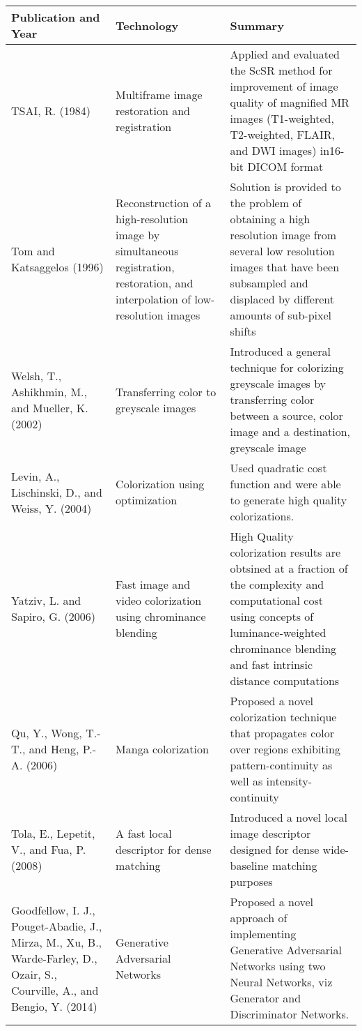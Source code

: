 \documentclass[12pt]{article}
\begin{document}
  \begin{tabularx}{\textwidth}{| X | X | X | } \hline
\textbf{Publication and Year} &	 \textbf{Technology} & \textbf{Summary} \\ \hline


TSAI, R. (1984) & Multiframe image restoration and registration & Applied and evaluated the ScSR method for improvement of image quality of magnified MR images (T1-weighted, T2-weighted, FLAIR, and DWI images) in16-bit DICOM format \\ \hline

Tom and Katsaggelos (1996) & Reconstruction of a high-resolution image by simultaneous registration, restoration, and interpolation of low-resolution images & Solution is provided to the problem of obtaining a high resolution image from several low resolution images that have been subsampled and displaced by different amounts of sub-pixel shifts \\ \hline

Welsh, T., Ashikhmin, M., and Mueller, K. (2002) & Transferring color to greyscale images &  Introduced a general technique for colorizing greyscale images by transferring color between a source, color image and a destination, greyscale image \\ \hline

Levin, A., Lischinski, D., and Weiss, Y. (2004) &  Colorization using optimization & Used quadratic cost function and were able to generate high quality colorizations. \\ \hline

Yatziv, L. and Sapiro, G. (2006) & Fast image and video colorization using chrominance blending & High Quality colorization results are obtsined at a fraction of the complexity and computational cost using concepts of luminance-weighted chrominance blending and fast intrinsic distance computations \\ \hline

Qu, Y., Wong, T.-T., and Heng, P.-A. (2006) &  Manga colorization & Proposed a novel colorization technique that propagates color over regions exhibiting pattern-continuity as well as intensity-continuity\\ \hline

Tola, E., Lepetit, V., and Fua, P. (2008) & A fast local descriptor for dense matching & Introduced a novel local image descriptor designed for dense wide-baseline matching purposes \\ \hline

Goodfellow, I. J., Pouget-Abadie, J., Mirza, M., Xu, B., Warde-Farley, D., Ozair, S., Courville, A., and Bengio, Y. (2014) & Generative Adversarial Networks & Proposed a novel approach of implementing Generative Adversarial Networks using two Neural Networks, viz Generator and Discriminator Networks.\\ \hline


\end{tabularx}
\end{document}
